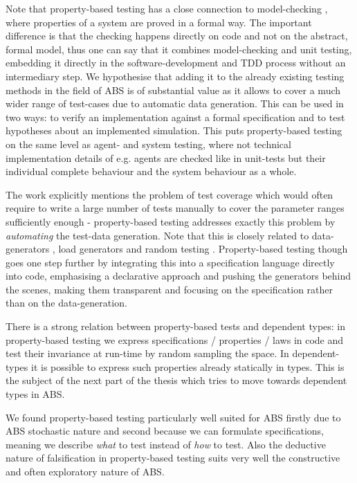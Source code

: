 \medskip

Note that property-based testing has a close connection to model-checking \cite{mcmillan_symbolic_1993}, where properties of a system are proved in a formal way. The important difference is that the checking happens directly on code and not on the abstract, formal model, thus one can say that it combines model-checking and unit testing, embedding it directly in the software-development and TDD process without an intermediary step. We hypothesise that adding it to the already existing testing methods in the field of ABS is of substantial value as it allows to cover a much wider range of test-cases due to automatic data generation. This can be used in two ways: to verify an implementation against a formal specification and to test hypotheses about an implemented simulation. This puts property-based testing on the same level as agent- and system testing, where not technical implementation details of e.g. agents are checked like in unit-tests but their individual complete behaviour and the system behaviour as a whole.

The work \cite{onggo_test-driven_2016} explicitly mentions the problem of test coverage which would often require to write a large number of tests manually to cover the parameter ranges sufficiently enough - property-based testing addresses exactly this problem by \textit{automating} the test-data generation. Note that this is closely related to data-generators \cite{gurcan_generic_2013}, load generators and random testing \cite{burnstein_practical_2010}. Property-based testing though goes one step further by integrating this into a specification language directly into code, emphasising a declarative approach and pushing the generators behind the scenes, making them transparent and focusing on the specification rather than on the data-generation. 





There is a strong relation between property-based tests and dependent types: in property-based testing we express specifications / properties / laws in code and test their invariance at run-time by random sampling the space. In dependent-types it is possible to express such properties already statically in types. This is the subject of the next part of the thesis which tries to move towards dependent types in ABS.

We found property-based testing particularly well suited for ABS firstly due to ABS stochastic nature and second because we can formulate specifications, meaning we describe \textit{what} to test instead of \textit{how} to test. Also the deductive nature of falsification in property-based testing suits very well the constructive and often exploratory nature of ABS. 

